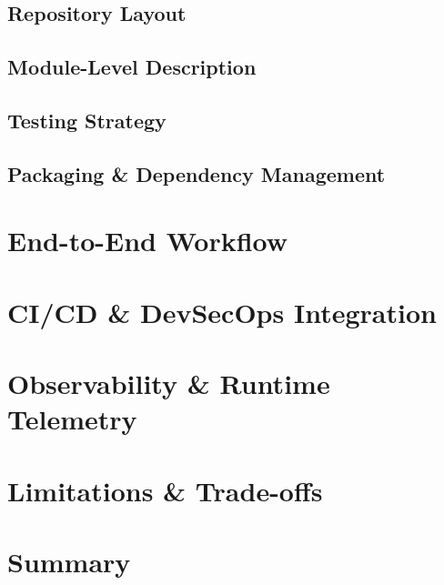 \subsection{Repository Layout}

\subsection{Module-Level Description}

\subsection{Testing Strategy}

\subsection{Packaging & Dependency Management}

\section{End-to-End Workflow}

\section{CI/CD & DevSecOps Integration}

\section{Observability & Runtime Telemetry}

\section{Limitations & Trade-offs}

\section{Summary}
